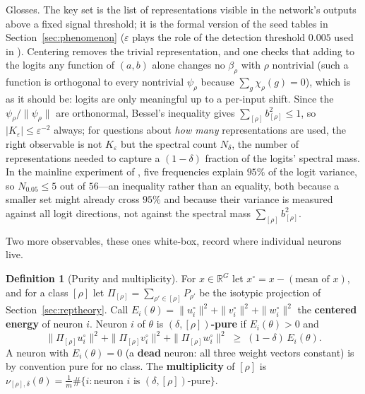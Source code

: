 \documentclass[11pt]{amsart}
\theoremstyle{plain}
\theoremstyle{definition}
\newtheorem{definition}[theorem]{Definition}
\newcommand{\R}{\mathbb{R}}
\begin{document}
Glosses. The key set is the list of representations visible in the network's outputs above a fixed signal threshold; it is the formal version of the seed tables in Section~\ref{sec:phenomenon} ($\varepsilon$ plays the role of the detection threshold $0.005$ used in \cite{chughtai2023}). Centering removes the trivial representation, and one checks that adding to the logits any function of $(a,b)$ alone changes no $\beta_\rho$ with $\rho$ nontrivial (such a function is orthogonal to every nontrivial $\psi_\rho$ because $\sum_g \chi_\rho(g) = 0$), which is as it should be: logits are only meaningful up to a per-input shift. Since the $\psi_\rho / \|\psi_\rho\|$ are orthonormal, Bessel's inequality gives $\sum_{[\rho]} b_{[\rho]}^2 \leq 1$, so $|K_\varepsilon| \leq \varepsilon^{-2}$ always; for questions about \emph{how many} representations are used, the right observable is not $K_\varepsilon$ but the spectral count $N_\delta$, the number of representations needed to capture a $(1-\delta)$ fraction of the logits' spectral mass. In the mainline experiment of \cite{nanda2023}, five frequencies explain $95\%$ of the logit variance, so $N_{0.05} \leq 5$ out of $56$---an inequality rather than an equality, both because a smaller set might already cross $95\%$ and because their variance is measured against all logit directions, not against the spectral mass $\sum_{[\rho]} b_{[\rho]}^2$.

Two more observables, these ones white-box, record where individual neurons live.

\begin{definition}[Purity and multiplicity]\label{def:purity}
For $x \in \R^G$ let $x^\circ = x - (\text{mean of } x)$, and for a class $[\rho]$ let $\Pi_{[\rho]} = \sum_{\rho' \in [\rho]} P_{\rho'}$ be the isotypic projection of Section~\ref{sec:reptheory}. Call $E_i(\theta) = \|u_i^\circ\|^2 + \|v_i^\circ\|^2 + \|w_i^\circ\|^2$ the \textbf{centered energy} of neuron $i$. Neuron $i$ of $\theta$ is \textbf{$(\delta, [\rho])$-pure} if $E_i(\theta) > 0$ and
\[
   \|\Pi_{[\rho]} u_i^\circ\|^2 + \|\Pi_{[\rho]} v_i^\circ\|^2 + \|\Pi_{[\rho]} w_i^\circ\|^2
   \;\geq\; (1-\delta)\, E_i(\theta).
\]
A neuron with $E_i(\theta) = 0$ (a \textbf{dead} neuron: all three weight vectors constant) is by convention pure for no class. The \textbf{multiplicity} of $[\rho]$ is $\nu_{[\rho],\delta}(\theta) = \frac{1}{m} \#\{ i : \text{neuron } i \text{ is } (\delta,[\rho])\text{-pure} \}$.
\end{definition}
\end{document}
